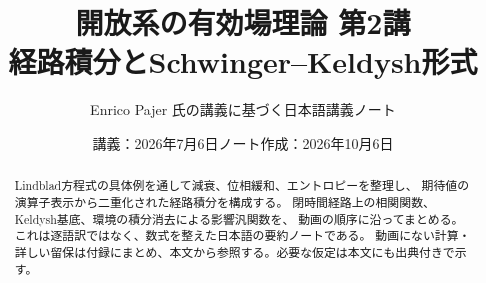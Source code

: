 \documentclass[a4paper,11pt]{ltjsarticle}
\title{\bfseries 開放系の有効場理論 第2講\\[0.5em]\large 経路積分とSchwinger--Keldysh形式}
\author{Enrico Pajer 氏の講義に基づく日本語講義ノート}
\date{講義：2026年7月6日\quad ノート作成：2026年10月6日}
\numberwithin{equation}{section}
\begin{document}
\maketitle

\begin{abstract}
Lindblad方程式の具体例を通して減衰、位相緩和、エントロピーを整理し、
期待値の演算子表示から二重化された経路積分を構成する。
閉時間経路上の相関関数、Keldysh基底、環境の積分消去による影響汎関数を、
動画の順序に沿ってまとめる。これは逐語訳ではなく、数式を整えた日本語の要約ノートである。
動画にない計算・詳しい留保は付録にまとめ、本文から参照する。必要な仮定は本文にも出典付きで示す。
\end{abstract}


\hypertarget{toc}{}
\tableofcontents
\clearpage

\end{document}
